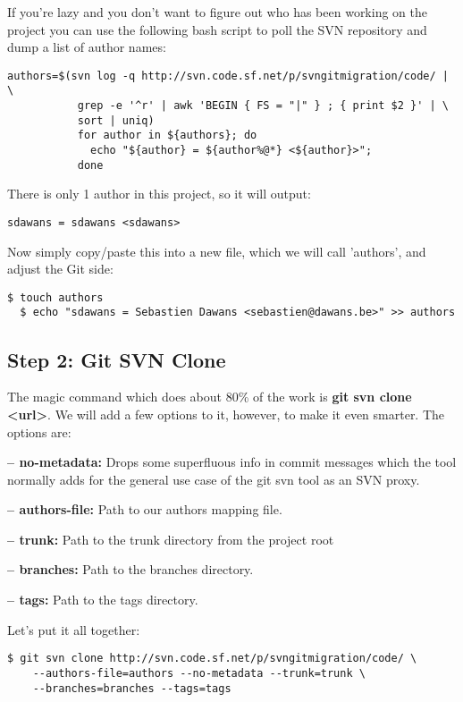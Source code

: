 \documentclass{../common/tufte-latex/tufte-handout}
\begin{document}
If you're lazy and you don't want to figure out who has been working on the project you can use the following bash script to poll the SVN repository and dump a list of author names:

\begin{lstlisting}[style=BashInputStyle]
authors=$(svn log -q http://svn.code.sf.net/p/svngitmigration/code/ | \ 
           grep -e '^r' | awk 'BEGIN { FS = "|" } ; { print $2 }' | \
           sort | uniq)
           for author in ${authors}; do
             echo "${author} = ${author%@*} <${author}>";
           done
\end{lstlisting}

There is only 1 author in this project, so it will output:

\begin{lstlisting}[style=BashInputStyle]
  sdawans = sdawans <sdawans>
\end{lstlisting}

Now simply copy/paste this into a new file, which we will call 'authors', and adjust the Git side:

\begin{lstlisting}[style=BashInputStyle]
  $ touch authors
  $ echo "sdawans = Sebastien Dawans <sebastien@dawans.be>" >> authors
\end{lstlisting}

\subsection{Step 2: Git SVN Clone}
The magic command which does about 80\% of the work is \textbf{git svn clone <url>}.
We will add a few options to it, however, to make it even smarter.
The options are:

\noindent \textbf{-- no-metadata:} Drops some superfluous info in commit messages which the tool normally adds for the general use case of the git svn tool as an SVN proxy.

\noindent \textbf{-- authors-file:} Path to our authors mapping file.

\noindent \textbf{-- trunk:} Path to the trunk directory from the project root

\noindent \textbf{-- branches:} Path to the branches directory.

\noindent \textbf{-- tags:} Path to the tags directory.

\noindent Let's put it all together:

\begin{lstlisting}[style=BashInputStyle]
  $ git svn clone http://svn.code.sf.net/p/svngitmigration/code/ \
    --authors-file=authors --no-metadata --trunk=trunk \ 
    --branches=branches --tags=tags
\end{lstlisting}
\end{document}
